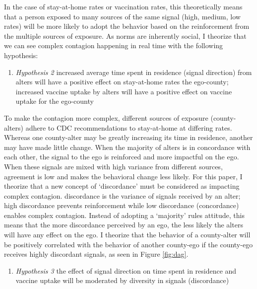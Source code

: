 In the case of stay-at-home rates or vaccination rates, this theoretically means
that a person exposed to many sources of the same signal (high, medium, low
rates) will be more likely to adopt the behavior based on the reinforcement from
the multiple sources of exposure. As norms are inherently social, I theorize
that we can see complex contagion happening in real time with the following
hypothesis:

\begin{enumerate}
\def\labelenumi{(\arabic{enumi})}
\setcounter{enumi}{1}
\tightlist
\item
  \emph{Hypothesis 2} increased average time spent in residence (signal direction) from alters will have a positive effect on stay-at-home rates the ego-county; increased vaccine uptake by alters will have a positive effect on vaccine uptake for the ego-county
\end{enumerate}

To make the contagion more complex, different sources of exposure
(county-alters) adhere to CDC recommendations to stay-at-home at differing
rates. Whereas one county-alter may be greatly increasing its time in residence,
another may have made little change. When the majority of alters is in
concordance with each other, the signal to the ego is reinforced and more
impactful on the ego. When these signals are mixed with high variance from
different sources, agreement is low and makes the behavioral change less likely.
For this paper, I theorize that a new concept of `discordance' must be
considered as impacting complex contagion. discordance is the variance of
signals received by an alter; high discordance prevents reinforcement while low
discordance (concordance) enables complex contagion. Instead of adopting a
`majority' rules attitude, this means that the more discordance perceived by an
ego, the less likely the alters will have any effect on the ego. I theorize that
the behavior of a county-alter will be positively correlated with the behavior
of another county-ego if the county-ego receives highly discordant signals, as
seen in Figure \ref{fig:dag}.

\begin{enumerate}
\def\labelenumi{(\arabic{enumi})}
\setcounter{enumi}{2}
\tightlist
\item
  \emph{Hypothesis 3} the effect of signal direction on time spent in residence and vaccine uptake will be moderated by diversity in signals (discordance)
\end{enumerate}

